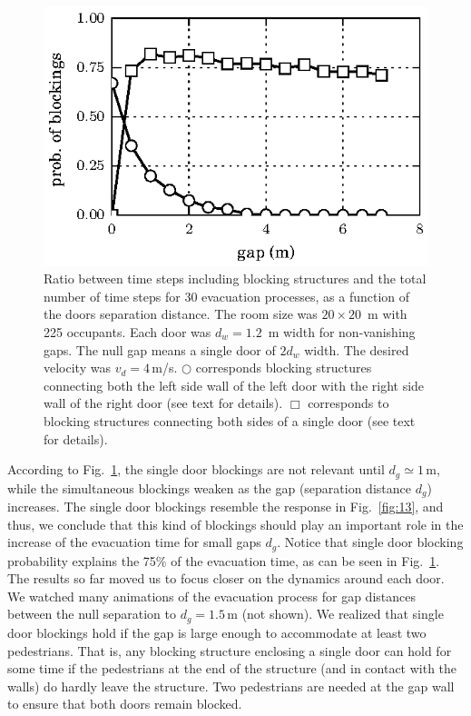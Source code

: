 \begin{figure}
\includegraphics[width=\columnwidth]{./fig12.eps}
\caption{\label{fig:14} Ratio between time steps including blocking structures 
and the total number of time steps for 30 evacuation processes, as a function 
of the doors separation distance. The room size was $20\times20$~m with 225 
occupants. Each door was $d_w=1.2$~m width for non-vanishing gaps. The null gap 
means a single door of $2d_w$ width. The desired velocity was $v_d=4\,$m/s.  
$\bigcirc$ corresponds blocking structures connecting both the left side wall 
of the left door with the right side wall of the right door (see text for 
details). $\Box$ corresponds to blocking structures connecting both sides of a 
single door (see text for details).   }
\end{figure}

According to Fig.~\ref{fig:14}, the single door blockings are not relevant 
until $d_g\simeq1\,$m, while the simultaneous blockings weaken as the gap 
(separation distance $d_g$) increases. The single door blockings resemble the 
response in Fig.~\ref{fig:13}, and thus, we conclude that this kind of 
blockings should play an important role in the increase of the evacuation time 
for small gaps $d_g$. Notice that single door blocking probability explains the 
75\% of the evacuation time, as can be seen in Fig.~\ref{fig:14}. \\

The results so far moved us to focus closer on the dynamics around each door. 
We watched many animations of the evacuation process for gap distances between 
the null separation to $d_g=1.5\,$m (not shown). We realized that single 
door blockings hold if the gap is large enough to accommodate at least two 
pedestrians. That is, any blocking structure enclosing a single door can hold 
for some time if the pedestrians at the end of the structure (and in contact 
with the walls) do hardly leave the structure. Two pedestrians are needed at the 
gap wall to ensure that both doors remain blocked.\\ 


